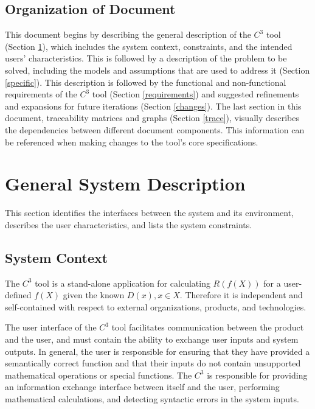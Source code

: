 \documentclass[12pt]{article}
\newcommand{\prognameAbbrv}{$C^{3}$}
\begin{document}
\subsection{Organization of Document}
This document begins by describing the general description of the 
\prognameAbbrv{} tool (Section \ref{general}), which includes the system 
context, constraints, and the intended users' characteristics. This is followed 
by a description of the problem to be solved, including the models and 
assumptions that are used to address it (Section \ref{specific}). This 
description is followed by the functional and non-functional requirements of 
the \prognameAbbrv{} tool (Section \ref{requirements}) and suggested 
refinements and expansions for future iterations (Section \ref{changes}). The 
last section in this document, traceability matrices and graphs (Section 
\ref{trace}), visually describes the dependencies between different document 
components. This information can be referenced when making changes to the 
tool's core specifications.

\section{General System Description}
\label{general}

This section identifies the interfaces between the system and its environment,
describes the user characteristics, and lists the system constraints.

\subsection{System Context}
The \prognameAbbrv{} tool is a stand-alone application for calculating 
$R(f(X))$ for a user-defined $f(X)$ given the known $D(x), x\in X$. Therefore 
it is independent and self-contained with respect to external organizations, 
products, and technologies.

The user interface of the \prognameAbbrv{} tool facilitates communication 
between the product and the user, and must contain the ability to exchange user 
inputs and system outputs. In general, the user is responsible for ensuring 
that they have provided a semantically correct function and that their inputs 
do not contain unsupported mathematical operations or special functions. The 
\prognameAbbrv{} is responsible for providing an information exchange interface 
between itself and the user, performing mathematical calculations, and 
detecting syntactic errors in the system inputs.
\end{document}
